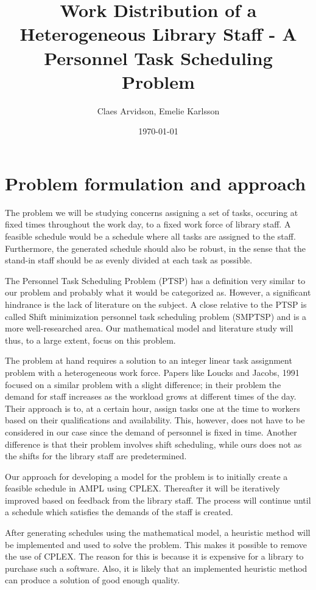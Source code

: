 \documentclass{article}
\title{Work Distribution of a Heterogeneous Library Staff - A Personnel Task Scheduling Problem}
\author{Claes Arvidson, Emelie Karlsson}
\date{\today}
\begin{document}
 
\maketitle
\pagebreak
 
\section*{Problem formulation and approach}
The problem we will be studying concerns assigning a set of tasks, occuring at fixed times throughout the work day, to a fixed work force of library staff. A feasible schedule would be a schedule where all tasks are assigned to the staff. Furthermore, the generated schedule should also be robust, in the sense that the stand-in staff should be as evenly divided at each task as possible.

The Personnel Task Scheduling Problem (PTSP) has a definition very similar to our problem and probably what it would be categorized as. However, a significant hindrance is the lack of literature on the subject. A close relative to the PTSP is called Shift minimization personnel task scheduling problem (SMPTSP) and is a more well-researched area. Our mathematical model and literature study will thus, to a large extent, focus on this problem.

The problem at hand requires a solution to an integer linear task assignment problem with a heterogeneous work force. Papers like Loucks and Jacobs, 1991 focused on a similar problem with a slight difference; in their problem the demand for staff increases as the workload grows at different times of the day. Their approach is to, at a certain hour, assign tasks one at the time to workers based on their qualifications and availability. This, however, does not have to be considered in our case since the demand of personnel is fixed in time. Another difference is that their problem involves shift scheduling, while ours does not as the shifts for the library staff are predetermined.

Our approach for developing a model for the problem is to initially create a feasible schedule in AMPL using CPLEX. Thereafter it will be iteratively improved based on feedback from the library staff. The process will continue until a schedule which satisfies the demands of the staff is created.

After generating schedules using the mathematical model, a heuristic method will be implemented and used to solve the problem. This makes it possible to remove the use of CPLEX. The reason for this is because it is expensive for a library to purchase such a software. Also, it is likely that an implemented heuristic method can produce a solution of good enough quality.
\end{document}
